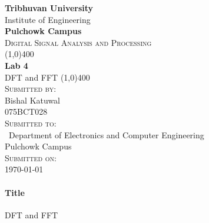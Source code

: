 \documentclass[12pt]{article}
\begin{document}
\begin{titlepage}
    \begin{center}
        \huge{\bfseries  Tribhuvan University}\\
        \Large{Institute of Engineering}\\
        \huge{ \bfseries  Pulchowk Campus}\\[3.2cm]


        \textsc{\Large Digital Signal Analysis and Processing}\\[-0.5cm]
        \line(1,0){400}\\
        \huge{\bfseries Lab 4}\\
        \huge{DFT and FFT}
        \line(1,0){400}\\


        \textsc{\Large Submitted by:}\\
        \Large Bishal Katuwal\\ \large 075BCT028\\    [0.85cm]

        \textsc{\Large Submitted to:}\\\
        \large Department of Electronics and Computer Engineering\\Pulchowk Campus\\    [0.85cm]
        
        \textsc{\Large Submitted on:}\\
        \today
        
    \end{center}
\end{titlepage}
\pagebreak
\paragraph{Title\\}
DFT and FFT
\end{document}
